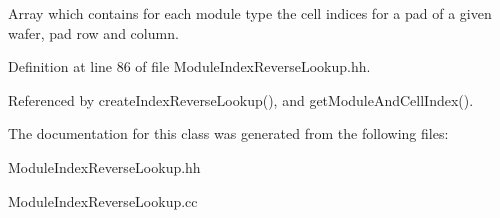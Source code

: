 Array which contains for each module type the cell indices for a pad of a given wafer, pad row and column. 



Definition at line 86 of file Module\-Index\-Reverse\-Lookup.\-hh.



Referenced by create\-Index\-Reverse\-Lookup(), and get\-Module\-And\-Cell\-Index().



The documentation for this class was generated from the following files\-:\begin{DoxyCompactItemize}
\item 
Module\-Index\-Reverse\-Lookup.\-hh\item 
Module\-Index\-Reverse\-Lookup.\-cc\end{DoxyCompactItemize}
